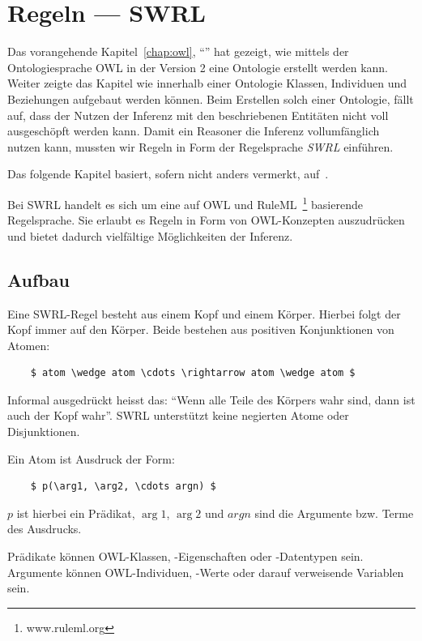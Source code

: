 \chapter{Regeln --- SWRL}
\label{chap:swrl}

Das vorangehende Kapitel~\ref{chap:owl}, ``'' hat gezeigt, wie mittels der Ontologiesprache OWL in der Version 2 eine Ontologie erstellt werden kann. Weiter zeigte das Kapitel wie innerhalb einer Ontologie Klassen, Individuen und Beziehungen aufgebaut werden können. Beim Erstellen solch einer Ontologie, fällt auf, dass der Nutzen der Inferenz mit den beschriebenen Entitäten nicht voll ausgeschöpft werden kann. Damit ein Reasoner die Inferenz vollumfänglich nutzen kann, mussten wir Regeln in Form der Regelsprache \textit{SWRL} einführen.

Das folgende Kapitel basiert, sofern nicht anders vermerkt, auf~\cite{swrl}.

Bei SWRL handelt es sich um eine auf OWL und RuleML~\footnote{www.ruleml.org} basierende Regelsprache. Sie erlaubt es Regeln in Form von OWL-Konzepten auszudrücken und bietet dadurch vielfältige Möglichkeiten der Inferenz.

\section{Aufbau}
\label{sec:swrl_aufbau}
Eine SWRL-Regel besteht aus einem Kopf und einem Körper. Hierbei folgt der Kopf immer auf den Körper. Beide bestehen aus positiven Konjunktionen von Atomen:
\lstset{language=XML}
\begin{lstlisting}
    $ atom \wedge atom \cdots \rightarrow atom \wedge atom $
\end{lstlisting}

Informal ausgedrückt heisst das: ``Wenn alle Teile des Körpers wahr sind, dann ist auch der Kopf wahr''. SWRL unterstützt keine negierten Atome oder Disjunktionen.

Ein Atom ist Ausdruck der Form:
\lstset{language=XML}
\begin{lstlisting}
    $ p(\arg1, \arg2, \cdots argn) $
\end{lstlisting}
$p$ ist hierbei ein Prädikat, $\arg1$, $\arg2$ und $argn$ sind die Argumente bzw. Terme des Ausdrucks.

Prädikate können OWL-Klassen, -Eigenschaften oder -Datentypen sein. Argumente können OWL-Individuen, -Werte oder darauf verweisende Variablen sein.

